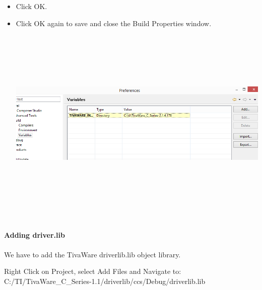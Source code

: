\documentclass[a4paper,10pt,oneside]{article}
\begin{document}
\begin{itemize}
						\item  Click OK.
						\item  Click OK again to save and close
						the Build Properties window.\\
						\includegraphics[width=20cm,height=10cm]{AddVariables9}
					\end{itemize}
					\paragraph{\Large \textbf{Adding driver.lib}}
					We have to add the TivaWare driverlib.lib object library. 
					\begin{center}
						Right Click on Project, select Add Files and Navigate to: \\	
						C:/TI/TivaWare\_C\_Series-1.1/driverlib/ccs/Debug/driverlib.lib \\
					\end{center}
\end{document}

